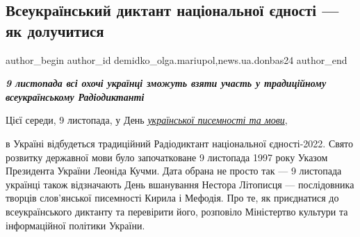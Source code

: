  
 
 
 
 
 
\subsection{Всеукраїнський диктант національної єдності — як долучитися}
\label{sec:08_11_2022.stz.news.ua.donbas24.1.vseukr_dyktant_jednosti_jak_doluchytys}
 
\ifcmt
 author_begin
   author_id demidko_olga.mariupol,news.ua.donbas24
 author_end
\fi

\begin{center}
  \em\color{blue}\bfseries\Large
9 листопада всі охочі українці зможуть взяти участь у традиційному всеукраїнському Радіодиктанті
\end{center}

Цієї середи, 9 листопада, у День \href{https://archive.org/details/28_07_2022.olga_demidko.donbas24.jak_shvydko_perejty_na_movu_porady}{\emph{української писемності та мови}}, 

в Україні
відбудеться традиційний Радіодиктант національної єдності-2022. Свято розвитку
державної мови було започатковане 9 листопада 1997 року Указом Президента
України Леоніда Кучми. Дата обрана не просто так — 9 листопада українці також
відзначають День вшанування Нестора Літописця — послідовника творців
слов'янської писемності Кирила і Мефодія. Про те, як приєднатися до
всеукраїнського диктанту та перевірити його, розповіло Міністертво культури та
інформаційної політики України.
